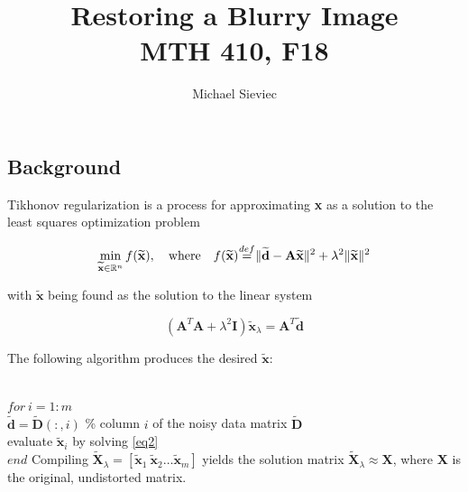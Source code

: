 \documentclass[12pt]{article}
\newcommand\defeq{\stackrel{\mathclap{def}}{=}}
\newcommand{\R}{\mathbb{R}}
\begin{document}
	\title{Restoring a Blurry Image\\
		\large MTH 410, F18}
	\author{Michael Sieviec}
	\maketitle
	\tableofcontents

\begin{flushleft}
\section{Background}
Tikhonov regularization is a process for approximating \textbf{x}  as a solution to the least squares optimization problem

\begin{equation}
\min_{\widetilde{\textbf{x}} \in \R^n} f(\widetilde{\textbf{x}}), \quad \text{where} \quad 
f(\widetilde{\textbf{x}}) \defeq \|\widetilde{\textbf{d}} - \textbf{A}\widetilde{\textbf{x}}\|^2 + \lambda^2\|\widetilde{\textbf{x}}\|^2
\label{eq1}
\end{equation}

with $\widetilde{\textbf{x}}$ being found as the solution to the linear system

\begin{equation}
	(\textbf{A}^T\textbf{A} + \lambda^2\textbf{I})\widetilde{\textbf{x}}_\lambda = \textbf{A}^T\widetilde{\textbf{d}}
	\label{eq2}
\end{equation}

The following algorithm produces the desired $\widetilde{\textbf{x}}$:
\linebreak

\quad {}\\
	\quad \quad $for\:i = 1:m$ \\
	\quad \qquad$ \widetilde{\textbf{d}} = \widetilde{\textbf{D}}(:,i)$ \quad \% column $i$ of the noisy data matrix $\widetilde{\textbf{D}}$\\
	\quad \qquad evaluate $\widetilde{\textbf{x}}_i$ by solving \eqref{eq2}\\
	\quad \quad $end$
\linebreak
\linebreak
Compiling $\widetilde{\textbf{X}}_\lambda = [\widetilde{\textbf{x}}_1 \: \widetilde{\textbf{x}}_2 \dots \widetilde{\textbf{x}}_m]$ yields the solution matrix $\widetilde{\textbf{X}}_\lambda \approx \textbf{X}$, where \textbf{X} is the original, undistorted matrix.


\end{flushleft}
\end{document}
